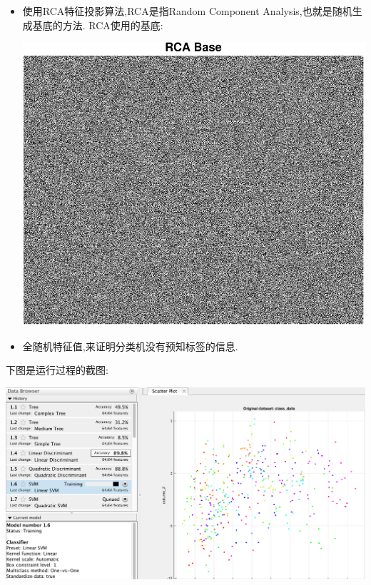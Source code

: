\begin{itemize}
	\item 使用RCA特征投影算法,RCA是指Random Component Analysis,也就是随机生成基底的方法. RCA使用的基底: 
			\begin{center}
	\begin{minipage}[t]{\linewidth}
	\center
	{
	\includegraphics[width=\MyFactor\textwidth]{Img/rca_base} 
	}
	\end{minipage}
	\medskip
	\end{center}
	\item 全随机特征值,来证明分类机没有预知标签的信息.
	

\end{itemize}



下图是运行过程的截图:
	
		\begin{center}
	\begin{minipage}[t]{\linewidth}
	\center
	{
	\includegraphics[width=\textwidth]{Img/class_training} 
	}
	\end{minipage}
	\medskip
	\end{center}

